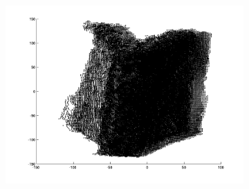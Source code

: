 \begin{figure}
\begin{subfigure}[b]{0.3\textwidth}
		\includegraphics[width=\textwidth]{Images/Book6.png}
		\caption{}
	\end{subfigure}
	

\end{figure}
